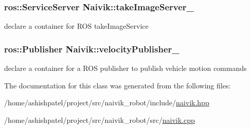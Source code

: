 \subsubsection[{\texorpdfstring{take\+Image\+Server\+\_\+}{takeImageServer_}}]{\setlength{\rightskip}{0pt plus 5cm}ros\+::\+Service\+Server Naivik\+::take\+Image\+Server\+\_\+\hspace{0.3cm}{\ttfamily [private]}}\hypertarget{classNaivik_a158e6056518bf811c8aab30f2341e0c6}{}\label{classNaivik_a158e6056518bf811c8aab30f2341e0c6}


declare a container for R\+OS take\+Image\+Service 

\subsubsection[{\texorpdfstring{velocity\+Publisher\+\_\+}{velocityPublisher_}}]{\setlength{\rightskip}{0pt plus 5cm}ros\+::\+Publisher Naivik\+::velocity\+Publisher\+\_\+\hspace{0.3cm}{\ttfamily [private]}}\hypertarget{classNaivik_aaaea1b99cc7f9c6d317e57516564aac9}{}\label{classNaivik_aaaea1b99cc7f9c6d317e57516564aac9}


declare a container for a R\+OS publisher to publish vehicle motion commands 



The documentation for this class was generated from the following files\+:\begin{DoxyCompactItemize}
\item 
/home/ashishpatel/project/src/naivik\+\_\+robot/include/\hyperlink{naivik_8hpp}{naivik.\+hpp}\item 
/home/ashishpatel/project/src/naivik\+\_\+robot/src/\hyperlink{naivik_8cpp}{naivik.\+cpp}\end{DoxyCompactItemize}
